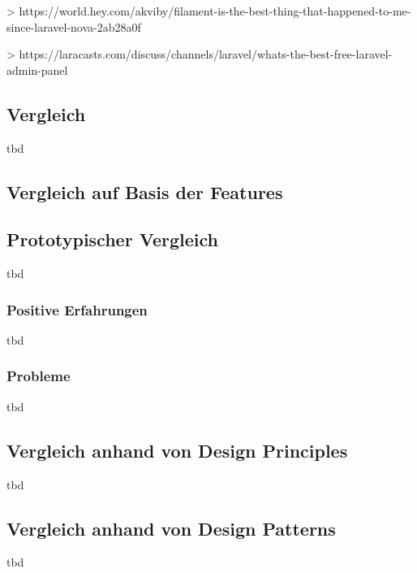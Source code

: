 > https://world.hey.com/akviby/filament-is-the-best-thing-that-happened-to-me-since-laravel-nova-2ab28a0f

> https://laracasts.com/discuss/channels/laravel/whats-the-best-free-laravel-admin-panel

\subsection{Vergleich}
tbd

\subsection{Vergleich auf Basis der Features}


\subsection{Prototypischer Vergleich}
tbd

\subsubsection{Positive Erfahrungen}
tbd

\subsubsection{Probleme}
tbd

\subsection{Vergleich anhand von Design Principles}
tbd

\subsection{Vergleich anhand von Design Patterns}
tbd
